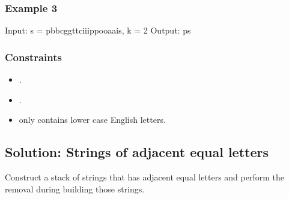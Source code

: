 \documentclass[letterpaper,12pt,english]{book}
\begin{document}
\subsubsection{Example 3}
\label{\detokenize{Stack/1209_Remove_All_Adjacent_Duplicates_in_String_II:example-3}}
\begin{sphinxVerbatim}[commandchars=\\\{\}]
Input: s = \PYGZdq{}pbbcggttciiippooaais\PYGZdq{}, k = 2
Output: \PYGZdq{}ps\PYGZdq{}
\end{sphinxVerbatim}


\subsubsection{Constraints}
\label{\detokenize{Stack/1209_Remove_All_Adjacent_Duplicates_in_String_II:constraints}}\begin{itemize}
\item {} 
\sphinxAtStartPar
{}.

\item {} 
\sphinxAtStartPar
{}.

\item {} 
\sphinxAtStartPar
{} only contains lower case English letters.

\end{itemize}


\subsection{Solution: Strings of adjacent equal letters}
\label{\detokenize{Stack/1209_Remove_All_Adjacent_Duplicates_in_String_II:solution-strings-of-adjacent-equal-letters}}
\sphinxAtStartPar
Construct a stack of strings that has adjacent equal letters and perform the removal during building those strings.
\end{document}
